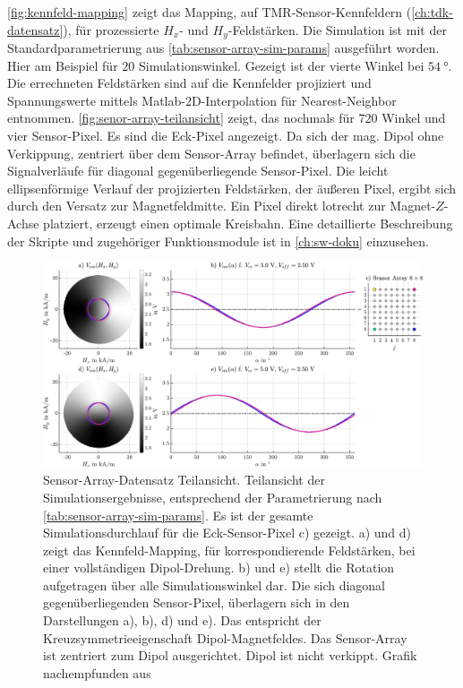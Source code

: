 \autoref{fig:kennfeld-mapping} zeigt das Mapping, auf TMR-Sensor-Kennfeldern (\autoref{ch:tdk-datensatz}), für prozessierte $H_x$- und $H_y$-Feldstärken. Die Simulation ist mit der Standardparametrierung aus \autoref{tab:sensor-array-sim-params} ausgeführt worden. Hier am Beispiel für $20$ Simulationswinkel. Gezeigt ist der vierte Winkel bei $\SI{54}{\degree}$. Die errechneten Feldstärken sind auf die Kennfelder projiziert und Spannungswerte mittels Matlab-2D-Interpolation für Nearest-Neighbor entnommen. \autoref{fig:senor-array-teilansicht} zeigt, das nochmals für $720$ Winkel und vier Sensor-Pixel. Es sind die Eck-Pixel angezeigt. Da sich der mag. Dipol ohne Verkippung, zentriert über dem Sensor-Array befindet, überlagern sich die Signalverläufe für diagonal gegenüberliegende Sensor-Pixel. Die leicht ellipsenförmige Verlauf der projizierten Feldstärken, der äußeren Pixel, ergibt sich durch den Versatz zur Magnetfeldmitte. Ein Pixel direkt lotrecht zur Magnet-$Z$-Achse platziert, erzeugt einen optimale Kreisbahn. Eine detaillierte Beschreibung der Skripte und zugehöriger Funktionsmodule ist in \autoref{ch:sw-doku} einzusehen.


\vspace{4mm}
\begin{figure}[bph]
	\centering
	\includegraphics[width=\linewidth]{appendix/images/5-Sensor-Array-Sim-Imp/Senor-Array-Teilansicht}
	\caption[Sensor-Array-Datensatz Teilansicht]{Sensor-Array-Datensatz Teilansicht. Teilansicht der Simulationsergebnisse, entsprechend der Parametrierung nach \autoref{tab:sensor-array-sim-params}. Es ist der gesamte Simulationsdurchlauf für die Eck-Sensor-Pixel c) gezeigt. a) und d) zeigt das Kennfeld-Mapping, für korrespondierende Feldstärken, bei einer vollständigen Dipol-Drehung. b) und e) stellt die Rotation aufgetragen über alle Simulationswinkel dar. Die sich diagonal gegenüberliegenden Sensor-Pixel, überlagern sich in den Darstellungen a), b), d) und e). Das entspricht der Kreuzsymmetrieeigenschaft Dipol-Magnetfeldes. Das Sensor-Array ist zentriert zum Dipol ausgerichtet. Dipol ist nicht verkippt. Grafik nachempfunden aus \cite{Schuethe2019}}
	\label{fig:senor-array-teilansicht}
\end{figure}
